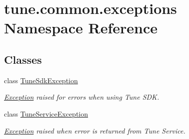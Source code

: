 \hypertarget{namespacetune_1_1common_1_1exceptions}{\section{tune.\-common.\-exceptions Namespace Reference}
\label{namespacetune_1_1common_1_1exceptions}
}
\subsection*{Classes}
\begin{DoxyCompactItemize}
\item 
class \hyperlink{classtune_1_1common_1_1exceptions_1_1TuneSdkException}{Tune\-Sdk\-Exception}
\begin{DoxyCompactList}\small\item\em \hyperlink{classException}{Exception} raised for errors when using Tune S\-D\-K. \end{DoxyCompactList}\item 
class \hyperlink{classtune_1_1common_1_1exceptions_1_1TuneServiceException}{Tune\-Service\-Exception}
\begin{DoxyCompactList}\small\item\em \hyperlink{classException}{Exception} raised when error is returned from Tune Service. \end{DoxyCompactList}\end{DoxyCompactItemize}
